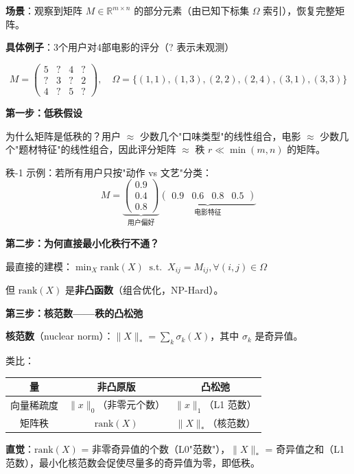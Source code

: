 \documentclass[12pt, a4paper]{ctexart}
\begin{document}
\begin{blackboard}

\textbf{场景}：观察到矩阵 $M \in \mathbb{R}^{m\times n}$ 的部分元素（由已知下标集 $\Omega$ 索引），恢复完整矩阵。

\textbf{具体例子}：3个用户对4部电影的评分（? 表示未观测）

\[
M = \begin{pmatrix}
5 & ? & 4 & ? \\
? & 3 & ? & 2 \\
4 & ? & 5 & ?
\end{pmatrix}, \quad
\Omega = \{(1,1),(1,3),(2,2),(2,4),(3,1),(3,3)\}
\]

\textbf{第一步：低秩假设}

为什么矩阵是低秩的？用户 $\approx$ 少数几个"口味类型"的线性组合，电影 $\approx$ 少数几个"题材特征"的线性组合，因此评分矩阵 $\approx$ 秩 $r \ll \min(m,n)$ 的矩阵。

秩-1 示例：若所有用户只按"动作 vs 文艺"分类：
\[
M = \underbrace{\begin{pmatrix}0.9\\0.4\\0.8\end{pmatrix}}_{\text{用户偏好}}
\underbrace{\begin{pmatrix}0.9 & 0.6 & 0.8 & 0.5\end{pmatrix}}_{\text{电影特征}}
\]

\textbf{第二步：为何直接最小化秩行不通？}

最直接的建模：$\min_X \text{rank}(X) \;\;\text{s.t.}\;\; X_{ij} = M_{ij}, \forall (i,j)\in\Omega$

但 $\text{rank}(X)$ 是\textbf{非凸函数}（组合优化，NP-Hard）。

\textbf{第三步：核范数——秩的凸松弛}

\textbf{核范数}（nuclear norm）：$\|X\|_* = \sum_k \sigma_k(X)$，其中 $\sigma_k$ 是奇异值。

类比：
\begin{center}
\begin{tabular}{c|c|c}
量 & 非凸原版 & 凸松弛 \\
\hline
向量稀疏度 & $\|x\|_0$（非零元个数） & $\|x\|_1$（L1 范数） \\
矩阵秩 & $\text{rank}(X)$ & $\|X\|_*$（核范数）
\end{tabular}
\end{center}

\textbf{直觉}：$\text{rank}(X)$ = 非零奇异值的个数（L0"范数"），$\|X\|_*$ = 奇异值之和（L1 范数），最小化核范数会促使尽量多的奇异值为零，即低秩。


\end{blackboard}
\end{document}
